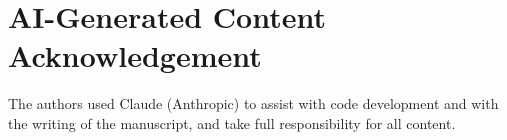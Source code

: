 \documentclass[conference]{IEEEtran}
\begin{document}
\section*{AI-Generated Content Acknowledgement}
The authors used Claude (Anthropic) to assist with code development and with the writing of the manuscript, and take full responsibility for all content.



\end{document}

